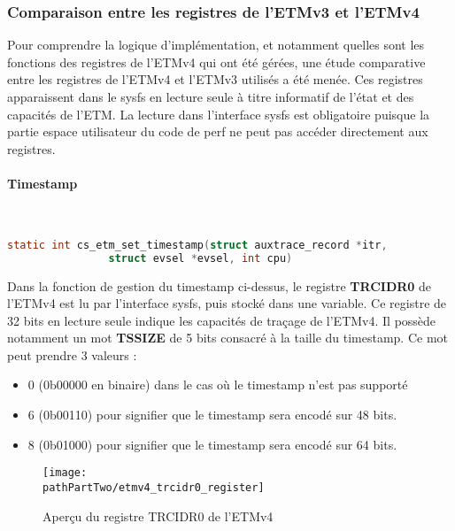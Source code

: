 \subsubsection{Comparaison entre les registres de l'ETMv3 et l'ETMv4}
\label{sec:etmv3_etmv4_comparison}

Pour comprendre la logique d'implémentation, et notamment quelles sont les
fonctions des registres de l'ETMv4 qui ont été gérées, une étude comparative
entre les registres de l'ETMv4 et l'ETMv3 utilisés a été menée. Ces registres
apparaissent dans le sysfs en lecture seule à titre informatif de l'état et
des capacités de l'ETM. La lecture dans l'interface sysfs est obligatoire
puisque la partie espace utilisateur du code de perf ne peut pas accéder
directement aux registres.

\paragraph{Timestamp}\mbox{}\\
\label{par:timestamp}

\begin{lstlisting}[language=C]
static int cs_etm_set_timestamp(struct auxtrace_record *itr,
				struct evsel *evsel, int cpu)
\end{lstlisting}

Dans la fonction de gestion du timestamp ci-dessus, le registre
\textbf{TRCIDR0} de l'ETMv4 est lu par l'interface sysfs, puis stocké dans une
variable. Ce registre de 32 bits en lecture seule indique les capacités de
traçage de l'ETMv4. Il possède notamment un mot \textbf{TSSIZE} de 5 bits
consacré à la taille du timestamp. Ce mot peut prendre 3 valeurs :

\begin{itemize}[label=\textbullet]
    \item 0 (0b00000 en binaire) dans le cas où le timestamp n'est pas
        supporté
    \item 6 (0b00110) pour signifier que le timestamp sera encodé sur 48 bits.
    \item 8 (0b01000) pour signifier que le timestamp sera encodé sur 64 bits. 
\end{itemize}

\begin{figure}[H]
	\begin{center}
		\texttt{[image: \\pathPartTwo/etmv4\_trcidr0\_register]}
		\caption{Aperçu du registre TRCIDR0 de l'ETMv4}
	    \label{fig:etmv4_trcidr0_register}
	\end{center}
\end{figure}

